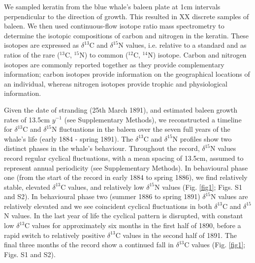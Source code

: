 \documentclass[a4paper,12pt]{article}
\begin{document}
We sampled keratin from the blue whale's baleen plate at 1cm intervals perpendicular to the direction of growth. 
This resulted in XX discrete samples of baleen. %
We then used continuous-flow isotope ratio mass spectrometry to determine the isotopic compositions of carbon and nitrogen in the keratin.
These isotopes are expressed as $\delta^{13}$C and $\delta^{15}$N values, i.e. relative to a standard and as ratios of the rare ($^{13}$C, $^{15}$N) to common ($^{12}$C, $^{14}$N) isotope\cite{west2006stable}.
Carbon and nitrogen isotopes are commonly reported together as they provide complementary information; carbon isotopes provide information on the geographical locations of an individual, whereas nitrogen isotopes provide trophic and physiological information\cite{west2006stable}.

Given the date of stranding (25th March 1891), and estimated baleen growth rates of 13.5cm $y^{-1}$ (see Supplementary Methods), we reconstructed a timeline for $\delta^{13}$C and $\delta^{15}$N fluctuations in the baleen over the seven full years of the whale's life (early 1884 - spring 1891). 
The $\delta^{13}$C and $\delta^{15}$N profiles show two distinct phases in the whale's behaviour. 
Throughout the record, $\delta^{15}$N values record regular cyclical fluctuations, with a mean spacing of 13.5cm, assumed to represent annual periodicity (see Supplementary Methods).  
In behavioural phase one (from the start of the record in early 1884 to spring 1886), we find relatively stable, elevated $\delta^{13}$C values, and relatively low $\delta^{15}$N values (Fig. \ref{fig1}; Figs. S1 and S2). 
In behavioural phase two (summer 1886 to spring 1891) $\delta^{15}$N values are relatively elevated and we see coincident cyclical fluctuations in both $\delta^{13}$C and $\delta^{15}$N values. 
In the last year of life the cyclical pattern is disrupted, with constant low $\delta^{13}$C values for approximately six months in the first half of 1890, before a rapid switch to relatively positive $\delta^{13}$C values in the second half of 1891. 
The final three months of the record show a continued fall in $\delta^{13}$C values (Fig. \ref{fig1}; Figs. S1 and S2).
\end{document}

